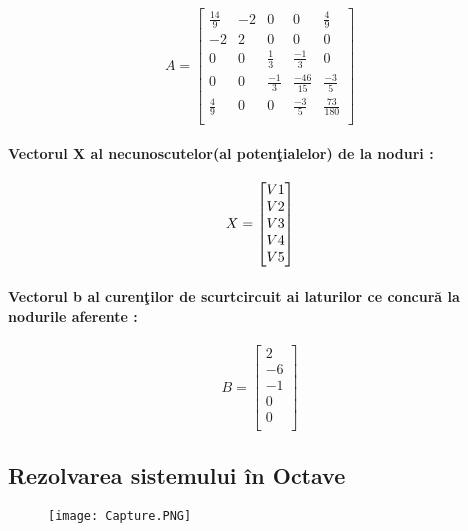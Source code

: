 \documentclass[12pt,twoside]{report}
\numberwithin{figure}{section}
\begin{document}
			\[
				A =
  				\begin{bmatrix}
    			\frac{14}{9} & -2 & 0 & 0 & \frac{4}{9} \\
    			-2 & 2 & 0 & 0 & 0 \\
    			0 & 0 & \frac{1}{3} & \frac{-1}{3} & 0 \\
    			0 & 0 & \frac{-1}{3} & \frac{-46}{15} & \frac{-3}{5} \\
    			\frac{4}{9} & 0 & 0 & \frac{-3}{5} & \frac{73}{180} \\
    			
    			
  				\end{bmatrix}
			\]
			
			\paragraph{Vectorul X al necunoscutelor(al poten\c{t}ialelor) de la noduri :}
			
			\[
				X =
  				\begin{bmatrix}
    			V\small{1}\\
    			V\small{2}\\
    			V\small{3}\\
    			V\small{4}\\
    			V\small{5}\\
  				\end{bmatrix}
			\]
			
			\paragraph{Vectorul b al curen\c{t}ilor de scurtcircuit ai laturilor ce concur\u{a} la nodurile aferente :}
			
		
			\[
				B =
  				\begin{bmatrix}
    			2\\
    			-6\\
    			-1\\
    			0\\
    			0\\
  				\end{bmatrix}
			\]
			
			
			
			
			\hfill
			\newpage
			\subsection{Rezolvarea sistemului \^{i}n Octave}
			\begin{figure}
			\texttt{[image: Capture.PNG]}
			\vspace{1cm}
			\end{figure}
			\endpage
	
\end{document}
